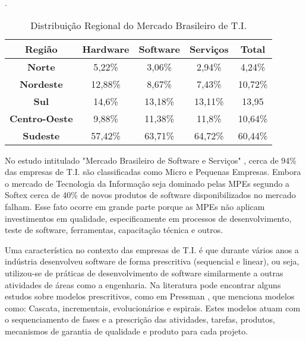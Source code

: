\begin{table}[H]
\centering
\caption{Distribuição Regional do Mercado Brasileiro de T.I. \cite{abes-software2016}}.
\label{tab:1.1}
\begin{tabular}{|c|c|c|c|c|}
\hline
\textbf{Região}       & \textbf{Hardware} & \textbf{Software} & \textbf{Serviços} & \textbf{Total} 
    \\ \hline
\textbf{Norte}        & 5,22\%            & 3,06\%            & 2,94\%            & 4,24\%         
    \\ \hline
\textbf{Nordeste}     & 12,88\%           & 8,67\%            & 7,43\%            & 10,72\%        
    \\ \hline
\textbf{Sul}          & 14,6\%            & 13,18\%           & 13,11\%           & 13,95          
    \\ \hline
\textbf{Centro-Oeste} & 9,88\%            & 11,38\%           & 11,8\%            & 10,64\%        
    \\ \hline
\textbf{Sudeste}      & 57,42\%           & 63,71\%           & 64,72\%           & 60,44\%        
    \\ \hline
\end{tabular}
\end{table}

No estudo intitulado "Mercado Brasileiro de Software e Serviços" \cite{abes-software2016}, cerca de 94\% das empresas de T.I. são classificadas como Micro e Pequenas Empresas. Embora o mercado de Tecnologia da Informação seja dominado pelas MPEs segundo a Softex \cite{GuiaMPTbr} cerca de 40\% de novos produtos de software disponibilizados no mercado falham. Esse fato ocorre em grande parte porque as MPEs não aplicam investimentos em qualidade, especificamente em processos de desenvolvimento, teste de software, ferramentas, capacitação técnica e outros.

Uma característica no contexto das empresas de T.I. é que durante vários anos a indústria desenvolveu software de forma prescritiva (sequencial e linear), ou seja, utilizou-se de práticas de desenvolvimento de software similarmente a outras atividades de áreas como a engenharia. Na literatura pode encontrar alguns estudos sobre modelos prescritivos, como em Pressman \cite{PRESSMAN2011}, que menciona modelos como: Cascata, incrementais, evolucionários e espirais. Estes modelos atuam com o sequenciamento de fases e a prescrição das atividades, tarefas, produtos, mecanismos de garantia de qualidade e produto para cada projeto. 


